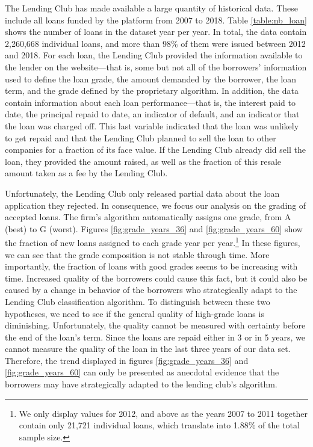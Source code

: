 \documentclass[12pt]{article} %
\begin{document}
The Lending Club has made available a large quantity of historical data. 
These include all loans funded by the platform from 2007 to 2018. Table \ref{table:nb_loan} shows the number of loans in the dataset year per year.  In total, the data contain 2,260,668 individual loans, and more than 98\% of them were issued between 2012 and 2018. For each loan, the Lending Club provided the information available to the lender on the website---that is, some but not all of the borrowers' information used to define the loan grade, the amount demanded by the borrower, the loan term, and the grade defined by the proprietary algorithm. In addition, the data contain information about each loan performance---that is, the interest paid to date, the principal repaid to date, an indicator of default, and an indicator that the loan was charged off. This last variable indicated that the loan was unlikely to get repaid and that the Lending Club planned to sell the loan to other companies for a fraction of its face value. If the Lending Club already did sell the loan, they provided the amount raised, as well as the fraction of this resale amount taken as a fee by the Lending Club. 


Unfortunately, the Lending Club only released partial data about the loan application they rejected. In consequence, we focus our analysis on the grading of accepted loans. The firm's algorithm automatically assigns one grade, from A (best) to G (worst). Figures \ref{fig:grade_years_36} and \ref{fig:grade_years_60} show the fraction of new loans assigned to each grade year per year.\footnote{We only display values for 2012, and above as the years 2007 to 2011 together contain only 21,721 individual loans, which translate into 1.88\% of the total sample size.} 
In these figures, we can see that the grade composition is not stable through time. More importantly, the fraction of loans with good grades seems to be increasing with time. Increased quality of the borrowers could cause this fact, but it could also be caused by a change in behavior of the borrowers who strategically adapt to the Lending Club classification algorithm. To distinguish between these two hypotheses, we need to see if the general quality of high-grade loans is diminishing. Unfortunately, the quality cannot be measured with certainty before the end of the loan's term. Since the loans are repaid either in 3 or in 5 years, we cannot measure the quality of the loan in the last three years of our data set. Therefore, the trend displayed in figures \ref{fig:grade_years_36} and \ref{fig:grade_years_60} can only be presented as anecdotal evidence that the borrowers may have strategically adapted to the lending club's algorithm.
\end{document}
